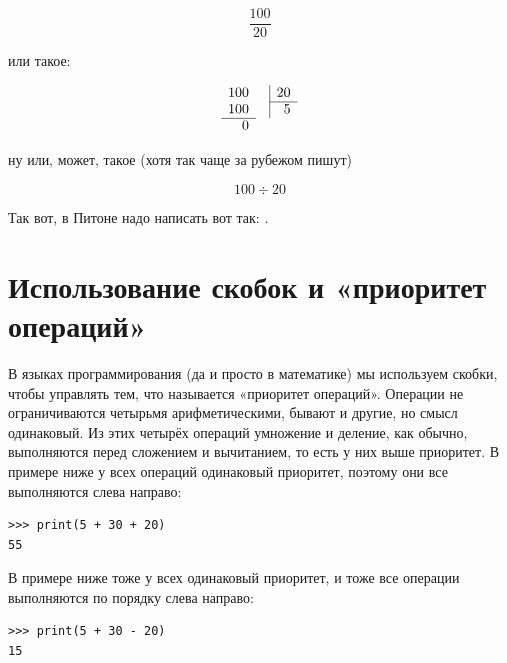 \begin{displaymath}
\frac{100}{20}
\end{displaymath}

или такое:

\begin{displaymath}
\begin{array}{rr|r}
100&&20\\
\cline{3-3}
100&&5\\
\cline{1-1}
0
\end{array}
\end{displaymath}

ну или, может, такое (хотя так чаще за рубежом пишут)

\begin{displaymath}
100 \div 20
\end{displaymath}

Так вот, в Питоне надо написать вот так: .


\section{Использование скобок и «приоритет операций»}

В языках программирования (да и просто в математике) мы используем скобки, чтобы управлять тем, что называется «приоритет операций». Операции не ограничиваются четырьмя арифметическими, бывают и другие, но смысл одинаковый. Из этих четырёх операций умножение и деление, как обычно, выполняются перед сложением и вычитанием, то есть у них выше приоритет. В примере ниже у всех операций одинаковый приоритет, поэтому они все выполняются слева направо:

\begin{listing}
\begin{verbatim}
>>> print(5 + 30 + 20)
55
\end{verbatim}
\end{listing}

В примере ниже тоже у всех одинаковый приоритет, и тоже все операции выполняются по порядку слева направо:

\begin{listing}
\begin{verbatim}
>>> print(5 + 30 - 20)
15
\end{verbatim}
\end{listing}

